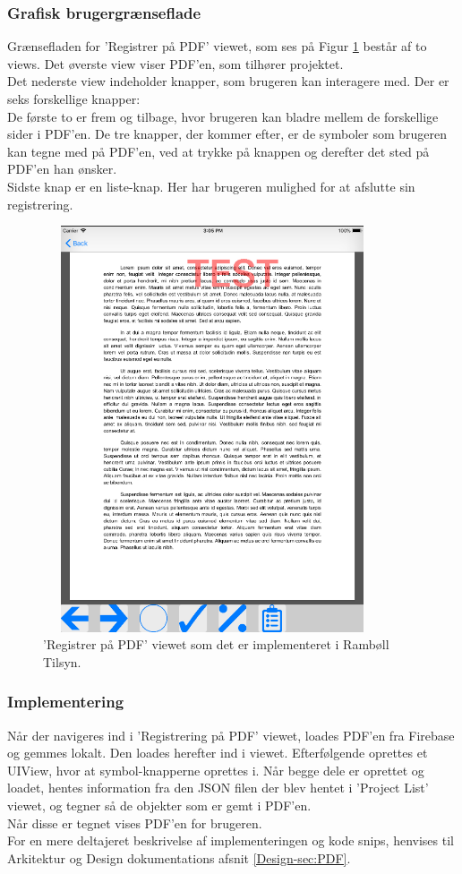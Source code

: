 \subsubsection{Grafisk brugergrænseflade}
Grænsefladen for 'Registrer på PDF' viewet, som ses på Figur \ref{fig:RegistrerObjekterView} består af to views. 
Det øverste view viser PDF'en, som tilhører projektet. \\
Det nederste view indeholder knapper, som brugeren kan interagere med. Der er seks forskellige knapper: \\
De første to er frem og tilbage, hvor brugeren kan bladre mellem de forskellige sider i PDF'en. De tre knapper, der kommer efter, er de symboler som brugeren kan tegne med på PDF'en, ved at trykke på knappen og derefter det sted på PDF'en han ønsker. \\
Sidste knap er en liste-knap. Her har brugeren mulighed for at afslutte sin registrering.
\begin{figure}[H] %
	\centering
	\includegraphics[height=12cm, width=10cm]{Design/Applikation/RegistrePDF/PDF}
	\caption{'Registrer på PDF' viewet som det er implementeret i Rambøll Tilsyn.}
	\label{fig:RegistrerObjekterView}
\end{figure}

\subsubsection{Implementering}
Når der navigeres ind i 'Registrering på PDF' viewet, loades PDF'en fra Firebase og gemmes lokalt. Den loades herefter ind i viewet. Efterfølgende oprettes et UIView, hvor at symbol-knapperne oprettes i. Når begge dele er oprettet og loadet, hentes information fra den JSON filen der blev hentet i 'Project List' viewet, og tegner så de objekter som er gemt i PDF'en. \\
Når disse er tegnet vises PDF'en for brugeren. \\
For en mere deltajeret beskrivelse af implementeringen og kode snips, henvises til Arkitektur og Design dokumentations afsnit \ref{Design-sec:PDF}.


\clearpage